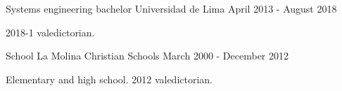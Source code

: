 

\begin{cventries}

  \cventry
    {Systems engineering bachelor} %
    {Universidad de Lima} %
    {} %
    {April 2013 - August 2018} %
    {
      \begin{cvitems} %
        \item {2018-1 valedictorian.}
      \end{cvitems}
    }

  \cventry
    {School} %
    {La Molina Christian Schools} %
    {} %
    {March 2000 - December 2012} %
    {
      \begin{cvitems} %
        \item {Elementary and high school. 2012 valedictorian.}
      \end{cvitems}
    }

\end{cventries}
